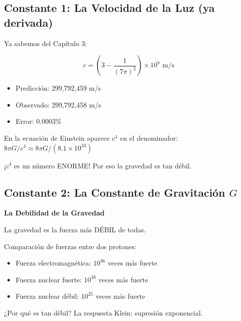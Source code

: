 \subsection{Constante 1: La Velocidad de la Luz (ya derivada)}

\begin{tcolorbox}[colback=kleingray, colframe=kleinblue]
Ya sabemos del Capítulo 3:

\begin{equation}
c = \left(3 - \frac{1}{(7\pi)^2}\right) \times 10^8 \text{ m/s}
\end{equation}

\begin{itemize}
    \item Predicción: 299,792,459 m/s
    \item Observado: 299,792,458 m/s
    \item Error: 0.0003\%
\end{itemize}

En la ecuación de Einstein aparece $c^4$ en el denominador:
$8\pi G/c^4 \approx 8\pi G / (8.1 \times 10^{33})$

¡$c^4$ es un número ENORME! Por eso la gravedad es tan débil.
\end{tcolorbox}


\subsection{Constante 2: La Constante de Gravitación $G$}

\begin{nivelconceptual}
\textbf{La Debilidad de la Gravedad}

La gravedad es la fuerza más DÉBIL de todas.

Comparación de fuerzas entre dos protones:
\begin{itemize}
    \item Fuerza electromagnética: $10^{36}$ veces más fuerte
    \item Fuerza nuclear fuerte: $10^{38}$ veces más fuerte
    \item Fuerza nuclear débil: $10^{25}$ veces más fuerte
\end{itemize}

¿Por qué es tan débil? La respuesta Klein: supresión exponencial.
\end{nivelconceptual}

